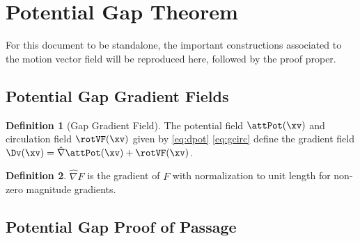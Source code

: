 \documentclass[letterpaper, 10pt, twocolumn]{article}
\theoremstyle{definition}
\newtheorem{definition}{Definition}[section]
\begin{document}
\section{Potential Gap Theorem}



For this document to be standalone, the important constructions
associated to the motion vector field will be reproduced here, followed
by the proof proper.

\subsection{Potential Gap Gradient Fields}


\begin{definition}[Gap Gradient Field]
  The potential field $\attPot(\xv)$ and circulation field $\rotVF(\xv)$
  given by \eqref{eq:dpot} \eqref{eq:gcirc} define the gradient field
  $\Dv(\xv) = \hat{\nabla}\attPot(\xv) + \rotVF(\xv)$.
\end{definition}

\begin{definition}
  $\hat \nabla F$ is the gradient of $F$ with normalization to unit length
  for non-zero magnitude gradients.
\end{definition}

\subsection{Potential Gap Proof of Passage}


\end{document}
